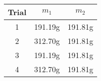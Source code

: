 \begin{tabular}{ | c | c c | } \hline
    Trial & $m_1$ & $m_2$ \\ \hline
    1 & 191.19g & 191.81g \\
    2 & 312.70g & 191.81g \\
    3 & 191.19g & 191.81g \\
    4 & 312.70g & 191.81g \\ \hline
\end{tabular}
